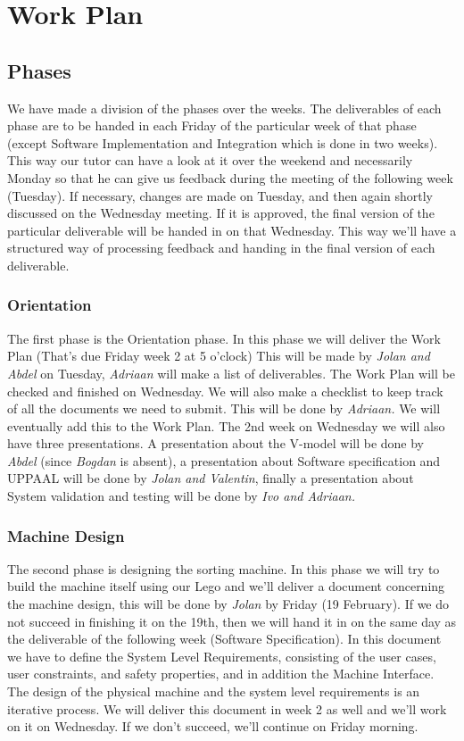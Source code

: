 \section{Work Plan} \label{orientation:work-plan}
\subsection{Phases}
We have made a division of the phases over the weeks. The deliverables of each phase are to be handed in each Friday of the particular week of that phase (except Software Implementation and Integration which is done in two weeks). This way our tutor can have a look at it over the weekend and necessarily Monday so that he can give us feedback during the meeting of the following week (Tuesday). If necessary, changes are made on Tuesday, and then again shortly discussed on the Wednesday meeting. If it is approved, the final version of the particular deliverable will be handed in on that Wednesday. This way we'll have a structured way of processing feedback and handing in the final version of each deliverable.\newpage 

\subsubsection{Orientation}
The first phase is the Orientation phase. In this phase we will deliver the Work Plan (That's due Friday week 2 at 5 o'clock) This will be made by \emph{Jolan and Abdel} on Tuesday, \emph{Adriaan} will make a list of deliverables. The Work Plan will be checked and finished on Wednesday. We will also make a checklist to keep track of all the documents we need to submit. This will be done by \emph{Adriaan.} We will eventually add this to the Work Plan. The 2nd week on Wednesday we will also have three presentations. A presentation about the V-model will be done by \emph{Abdel} (since \emph{Bogdan} is absent), a presentation about Software specification and UPPAAL will be done by \emph{Jolan and Valentin}, finally a presentation about System validation and testing will be done by \emph{Ivo and Adriaan.}

\subsubsection{Machine Design}
The second phase is designing the sorting machine. In this phase we will try to build the machine itself using our Lego and we'll deliver a document concerning the machine design, this will be done by \emph{Jolan} by Friday (19 February). If we do not succeed in finishing it on the 19th, then we will hand it in on the same day as the deliverable of the following week (Software Specification). In this document we have to define the System Level Requirements, consisting of the user cases, user constraints, and safety properties, and in addition the Machine Interface. The design of the physical machine and the system level requirements is an iterative process. We will deliver this document in week 2 as well and we'll work on it on Wednesday. If we don't succeed, we'll continue on Friday morning. 


